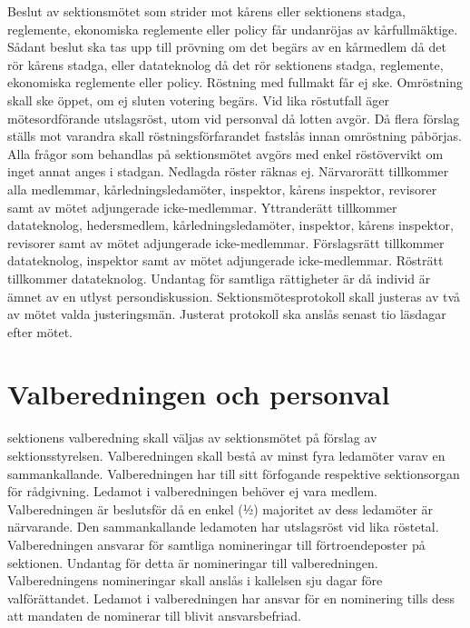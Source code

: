 \documentclass[a4paper]{dteklag}
\begin{document}
\para[Överklagande] Beslut av sektionsmötet som strider mot kårens eller sektionens stadga, reglemente, ekonomiska reglemente eller policy får undanröjas av kårfullmäktige.
\stycke Sådant beslut ska tas upp till prövning om det begärs av en kårmedlem då det rör kårens stadga, eller datateknolog då det rör sektionens stadga, reglemente, ekonomiska reglemente eller policy.
\para[Omröstning] Röstning med fullmakt får ej ske.
\para Omröstning skall ske öppet, om ej sluten votering begärs.
\para Vid lika röstutfall äger mötesordförande utslagsröst, utom vid personval då lotten avgör.
\para Då flera förslag ställs mot varandra skall röstningsförfarandet fastslås innan omröstning påbörjas.
\para Alla frågor som behandlas på sektionsmötet avgörs med enkel röstövervikt om inget annat anges i stadgan. Nedlagda röster räknas ej.
\para[Rättigheter] Närvarorätt tillkommer alla medlemmar, kårledningsledamöter, inspektor, kårens inspektor, revisorer samt av mötet adjungerade icke-medlemmar.
\para Yttranderätt tillkommer datateknolog, hedersmedlem, kårledningsledamöter, inspektor, kårens inspektor, revisorer samt av mötet adjungerade icke-medlemmar.
\para Förslagsrätt tillkommer datateknolog, inspektor samt av mötet adjungerade icke-medlemmar.
\para Rösträtt tillkommer datateknolog.
\para[Persondiskussion] Undantag för samtliga rättigheter är då individ är ämnet av en utlyst persondiskussion. 
\para[Protokoll] Sektionsmötesprotokoll skall justeras av två av mötet valda justeringsmän. Justerat protokoll ska anslås senast tio läsdagar efter mötet.

\section{Valberedningen och personval}
\para[Sammansättning] sektionens valberedning skall väljas av sektionsmötet på förslag av sektionsstyrelsen.
\para Valberedningen skall bestå av minst fyra ledamöter varav en sammankallande.
\para Valberedningen har till sitt förfogande respektive sektionsorgan för rådgivning.
\para Ledamot i valberedningen behöver ej vara medlem.
\para[Beslutsförhet] Valberedningen är beslutsför då en enkel (1⁄2) majoritet av dess ledamöter är närvarande.
\para Den sammankallande ledamoten har utslagsröst vid lika röstetal.
\para[Åligganden] Valberedningen ansvarar för samtliga nomineringar till förtroendeposter på sektionen.
\stycke Undantag för detta är nomineringar till valberedningen.
\para Valberedningens nomineringar skall anslås i kallelsen sju dagar före valförättandet.
\para Ledamot i valberedningen har ansvar för en nominering tills dess att mandaten de nominerar till blivit ansvarsbefriad. 
\end{document}
